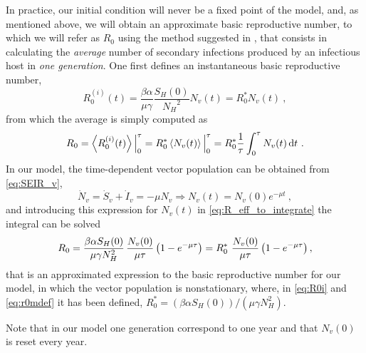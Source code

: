 In practice, our initial condition will never be a fixed point of the
model, and, as mentioned above, we will obtain an approximate basic
reproductive number, to which we will refer as $R_0$ using the method suggested
in \cite{GimenezRomero2022_PRE}, that consists in
calculating the \textit{average} number of secondary infections produced by
an infectious host in \textit{one generation}. One first defines an
instantaneous basic reproductive number,
\begin{equation}\label{eq:R0i}
    R_0^{(i)}(t)=\frac{\beta\alpha}{\mu\gamma}\frac{S_H(0)}{{N_H}^2}
    N_v(t)=R_0^* N_v(t) \ ,
\end{equation}
from which the average is simply computed as
\begin{equation}\label{eq:R_eff_to_integrate}
    R_0=\left<R_0^{(i)}(t)\right>\Big\rvert_{0}^{\tau}=
    R_0^*\left<N_v(t)\right>\Big\rvert_{0}^{\tau}=
    R_0^*\frac{1}{\tau}\int_0^{\tau}N_v(t)
    \, \mathrm{d} t \ .
\end{equation}
In our model, the time-dependent vector population can be obtained from
\cref{eq:SEIR_v},
\begin{equation}
    \dot{N}_v=\dot{S}_v+\dot{I}_v=-\mu N_v \Longrightarrow
    N_v(t)=N_v(0)e^{-\mu t} \ ,
\end{equation}
and introducing this expression for $N_v(t)$ in
\cref{eq:R_eff_to_integrate} the integral can be solved
\begin{equation}
    R_0={{\beta\alpha S_H(0)}\over{\mu\gamma N_H ^2}}
    \,\frac{N_v(0)}{\mu\tau}\left(1-e^{-\mu\tau}\right)=
    R_0^*\ \frac{N_v(0)}{\mu\tau}\left(1-e^{-\mu\tau}\right) ,
    \label{eq:r0mdef}
\end{equation}
that is an approximated expression to the basic reproductive number for our
model, in which the vector population is nonstationary,
where, in \cref{eq:R0i} and \cref{eq:r0mdef} it has been defined, $R_0^*=
    (\beta\alpha S_H(0))/(\mu\gamma N_H ^2)$.

Note that in our model one generation correspond to one year and that
$N_v(0)$ is reset every year.